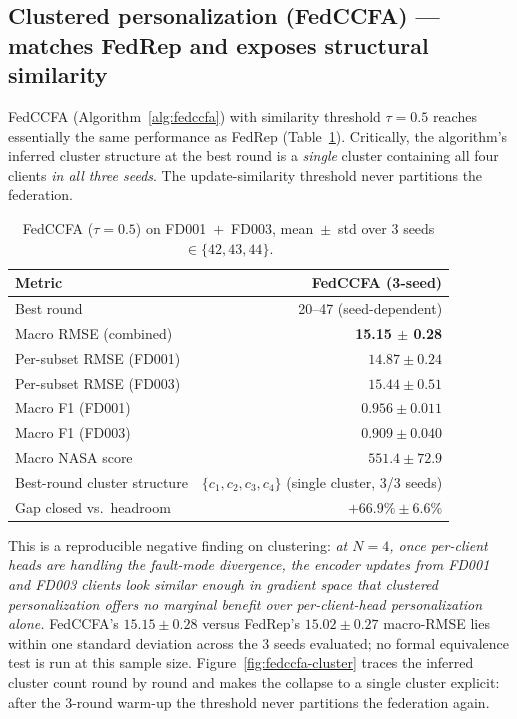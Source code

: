 \documentclass[a4paper,fleqn,doubleblind]{cas-sc}
\newcommand{\tblhead}{\rowcolor{tblHeadBg}}
\newcommand{\zebra}{\rowcolors{2}{tblAltBg}{white}}
\newcommand{\tblhead}{}
\newcommand{\zebra}{}
\begin{document}
\subsection{Clustered personalization (FedCCFA) --- matches FedRep and exposes structural similarity}
\label{sec:axis1-results-fedccfa}

FedCCFA (Algorithm~\ref{alg:fedccfa}) with similarity threshold
$\tau = 0.5$ reaches essentially the same performance as FedRep
(Table~\ref{tab:fedccfa}). Critically, the algorithm's inferred cluster
structure at the best round is a \emph{single} cluster containing all
four clients \emph{in all three seeds}. The update-similarity threshold
never partitions the federation.

\begin{table}[pos=tbp]
\centering
\small
\caption{FedCCFA ($\tau = 0.5$) on FD001~$+$~FD003, mean~$\pm$~std over
3 seeds $\in \{42, 43, 44\}$.}
\label{tab:fedccfa}
\zebra
\begin{tabular}{lr}
\toprule
\tblhead
Metric & FedCCFA (3-seed) \\
\midrule
Best round & 20--47 (seed-dependent) \\
Macro RMSE (combined) & \textbf{15.15 $\pm$ 0.28} \\
Per-subset RMSE (FD001) & $14.87 \pm 0.24$ \\
Per-subset RMSE (FD003) & $15.44 \pm 0.51$ \\
Macro F1 (FD001) & $0.956 \pm 0.011$ \\
Macro F1 (FD003) & $0.909 \pm 0.040$ \\
Macro NASA score & $551.4 \pm 72.9$ \\
Best-round cluster structure & $\{c_1, c_2, c_3, c_4\}$ (single cluster, 3/3 seeds) \\
Gap closed vs.\ headroom & \textbf{$+66.9\% \pm 6.6\%$} \\
\bottomrule
\end{tabular}
\end{table}

This is a reproducible negative finding on clustering: \emph{at $N = 4$,
once per-client heads are handling the fault-mode divergence, the
encoder updates from FD001 and FD003 clients look similar enough in
gradient space that clustered personalization offers no marginal benefit
over per-client-head personalization alone.} FedCCFA's $15.15 \pm 0.28$
versus FedRep's $15.02 \pm 0.27$ macro-RMSE lies within one
standard deviation across the 3 seeds evaluated; no formal
equivalence test is run at this sample size.
Figure~\ref{fig:fedccfa-cluster} traces the inferred cluster count
round by round and makes the collapse to a single cluster explicit:
after the 3-round warm-up the threshold never partitions the
federation again.
\end{document}
